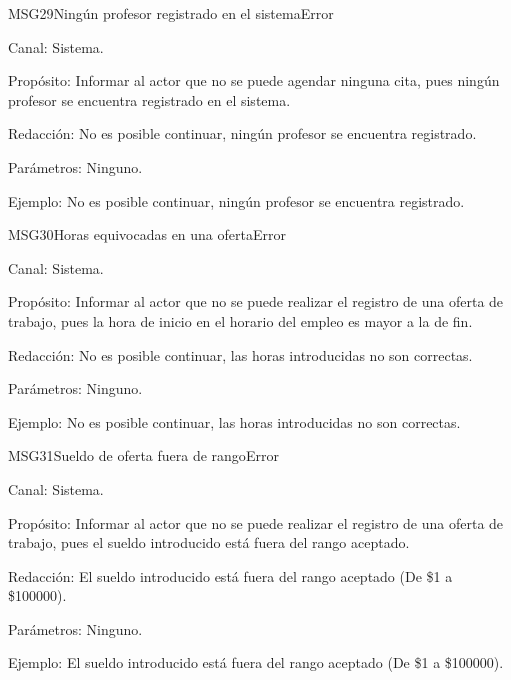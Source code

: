 \begin{mensaje}{MSG29}{Ningún profesor registrado en el sistema}{Error}
	\item[Canal:] Sistema.
    \item[Propósito:] Informar al actor que no se puede agendar ninguna cita, pues ningún profesor se encuentra registrado en el sistema.
    \item[Redacción:] No es posible continuar, ningún profesor se encuentra registrado.
    \item[Parámetros:] Ninguno.
    \item[Ejemplo:] No es posible continuar, ningún profesor se encuentra registrado.
\end{mensaje}

\begin{mensaje}{MSG30}{Horas equivocadas en una oferta}{Error}
	\item[Canal:] Sistema.
    \item[Propósito:] Informar al actor que no se puede realizar el registro de una oferta de trabajo, pues la hora de inicio en el horario del empleo es mayor a la de fin.
    \item[Redacción:] No es posible continuar, las horas introducidas no son correctas.
    \item[Parámetros:] Ninguno.
    \item[Ejemplo:] No es posible continuar, las horas introducidas no son correctas.
\end{mensaje}

\begin{mensaje}{MSG31}{Sueldo de oferta fuera de rango}{Error}
	\item[Canal:] Sistema.
    \item[Propósito:] Informar al actor que no se puede realizar el registro de una oferta de trabajo, pues el sueldo introducido está fuera del rango aceptado.
    \item[Redacción:] El sueldo introducido está fuera del rango aceptado (De \$1 a \$100000).
    \item[Parámetros:] Ninguno.
    \item[Ejemplo:] El sueldo introducido está fuera del rango aceptado (De \$1 a \$100000).
\end{mensaje}

